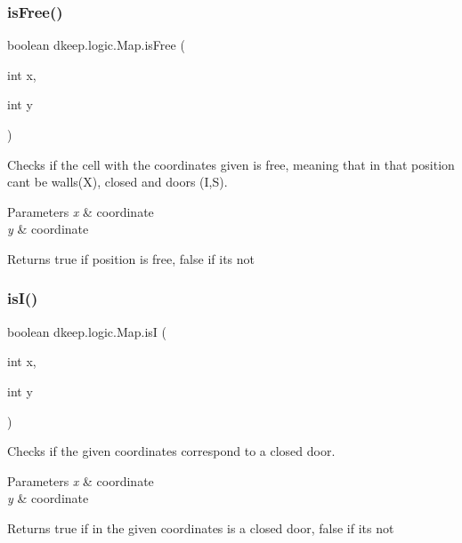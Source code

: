 \subsubsection{\texorpdfstring{is\+Free()}{isFree()}}
{\footnotesize\ttfamily boolean dkeep.\+logic.\+Map.\+is\+Free (\begin{DoxyParamCaption}\item[{int}]{x,  }\item[{int}]{y }\end{DoxyParamCaption})}

Checks if the cell with the coordinates given is free, meaning that in that position can\textquotesingle{}t be walls(\textquotesingle{}X\textquotesingle{}), closed and doors (\textquotesingle{}I\textquotesingle{},\textquotesingle{}S\textquotesingle{}). 
\begin{DoxyParams}{Parameters}
{\em x} & coordinate \\
\hline
{\em y} & coordinate \\
\hline
\end{DoxyParams}
\begin{DoxyReturn}{Returns}
true if position is free, false if it\textquotesingle{}s not 
\end{DoxyReturn}
\mbox{\label{classdkeep_1_1logic_1_1_map_aa0e97d3c7fc51f4fa0caaa286745ff72}} 
\subsubsection{\texorpdfstring{is\+I()}{isI()}}
{\footnotesize\ttfamily boolean dkeep.\+logic.\+Map.\+isI (\begin{DoxyParamCaption}\item[{int}]{x,  }\item[{int}]{y }\end{DoxyParamCaption})}

Checks if the given coordinates correspond to a closed door. 
\begin{DoxyParams}{Parameters}
{\em x} & coordinate \\
\hline
{\em y} & coordinate \\
\hline
\end{DoxyParams}
\begin{DoxyReturn}{Returns}
true if in the given coordinates is a closed door, false if it\textquotesingle{}s not 
\end{DoxyReturn}
\mbox{\label{classdkeep_1_1logic_1_1_map_a721b87b71cb211ab754b9077963546f3}} 
